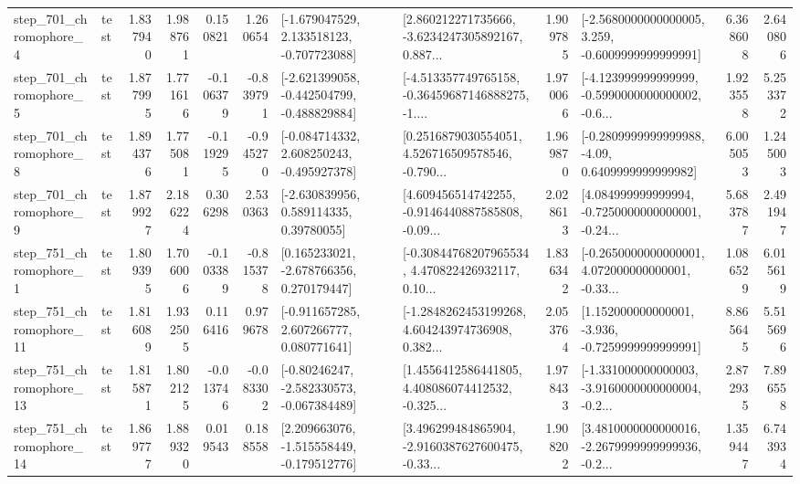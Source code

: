 \begin{tabular}{llrrrrllrlrr}
   step\_701\_chromophore\_4 &      test &      1.837940 &    1.988761 &      0.150821 &  1.260654 &   [-1.679047529, 2.133518123, -0.707723088] &  [2.860212271735666, -3.6234247305892167, 0.887... &       1.909785 &  [-2.5680000000000005, 3.259, -0.6009999999999991] &            6.368608 &          2.640806 \\
   step\_701\_chromophore\_5 &      test &      1.877995 &    1.771616 &     -0.106379 & -0.839791 &  [-2.621399058, -0.442504799, -0.488829884] &  [-4.513357749765158, -0.36459687146888275, -1.... &       1.970066 &  [-4.123999999999999, -0.5990000000000002, -0.6... &            1.923558 &          5.253372 \\
   step\_701\_chromophore\_8 &      test &      1.894376 &    1.775081 &     -0.119295 & -0.945270 &   [-0.084714332, 2.608250243, -0.495927378] &  [0.2516879030554051, 4.526716509578546, -0.790... &       1.969870 &   [-0.2809999999999988, -4.09, 0.6409999999999982] &            6.005053 &          1.245003 \\
   step\_701\_chromophore\_9 &      test &      1.879927 &    2.186224 &      0.306298 &  2.530363 &     [-2.630839956, 0.589114335, 0.39780055] &  [4.609456514742255, -0.9146440887585808, -0.09... &       2.028613 &  [4.084999999999994, -0.7250000000000001, -0.24... &            5.683787 &          2.491947 \\
   step\_751\_chromophore\_1 &      test &      1.809395 &    1.706006 &     -0.103389 & -0.815378 &    [0.165233021, -2.678766356, 0.270179447] &  [-0.30844768207965534, 4.470822426932117, 0.10... &       1.836342 &  [-0.2650000000000001, 4.072000000000001, -0.33... &            1.086529 &          6.015619 \\
  step\_751\_chromophore\_11 &      test &      1.816089 &    1.932505 &      0.116416 &  0.979678 &    [-0.911657285, 2.607266777, 0.080771641] &  [-1.2848262453199268, 4.604243974736908, 0.382... &       2.053764 &   [1.152000000000001, -3.936, -0.7259999999999991] &            8.865645 &          5.515696 \\
  step\_751\_chromophore\_13 &      test &      1.815871 &    1.802125 &     -0.013746 & -0.083302 &   [-0.80246247, -2.582330573, -0.067384489] &  [1.4556412586441805, 4.408086074412532, -0.325... &       1.978433 &  [-1.331000000000003, -3.9160000000000004, -0.2... &            2.872935 &          7.896558 \\
  step\_751\_chromophore\_14 &      test &      1.869777 &    1.889320 &      0.019543 &  0.188558 &   [2.209663076, -1.515558449, -0.179512776] &  [3.496299484865904, -2.9160387627600475, -0.33... &       1.908202 &  [3.4810000000000016, -2.2679999999999936, -0.2... &            1.359447 &          6.743934 \\

\end{tabular}

